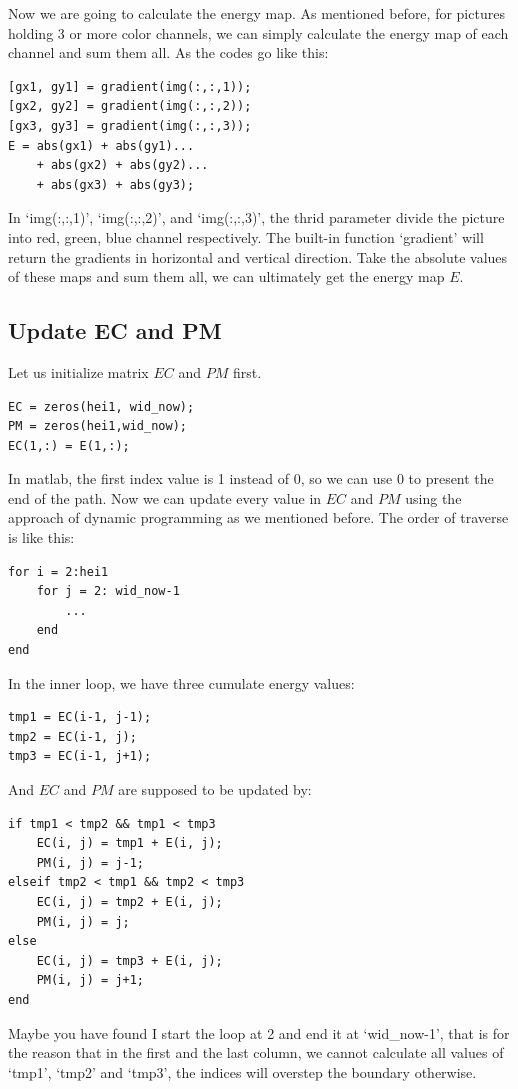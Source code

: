 \documentclass[final]{cvpr}
\begin{document}
Now we are going to calculate the energy map. As mentioned before, for pictures holding 3 or more color channels, we can simply calculate the energy map of each channel and sum them all. As the codes go like this:
\begin{lstlisting}
[gx1, gy1] = gradient(img(:,:,1));
[gx2, gy2] = gradient(img(:,:,2));
[gx3, gy3] = gradient(img(:,:,3));
E = abs(gx1) + abs(gy1)...
    + abs(gx2) + abs(gy2)...
    + abs(gx3) + abs(gy3);
\end{lstlisting}

In `img(:,:,1)', `img(:,:,2)', and `img(:,:,3)', the thrid parameter divide the picture into red, green, blue channel respectively. The built-in function `gradient' will return the gradients in horizontal and vertical direction. Take the absolute values of these maps and sum them all, we can ultimately get the energy map $E$.

\subsection{Update EC and PM}
Let us initialize matrix $EC$ and $PM$ first.
\begin{lstlisting}
EC = zeros(hei1, wid_now);
PM = zeros(hei1,wid_now);
EC(1,:) = E(1,:);
\end{lstlisting}

In matlab, the first index value is 1 instead of 0, so we can use 0 to present the end of the path.
Now we can update every value in $EC$ and $PM$ using the approach of dynamic programming as we mentioned before. The order of traverse is like this:
\begin{lstlisting}
for i = 2:hei1
    for j = 2: wid_now-1
        ...
    end
end
\end{lstlisting}

In the inner loop, we have three cumulate energy values:
\begin{lstlisting}
tmp1 = EC(i-1, j-1);
tmp2 = EC(i-1, j);
tmp3 = EC(i-1, j+1);
\end{lstlisting}

And $EC$ and $PM$ are supposed to be updated by:
\begin{lstlisting}
if tmp1 < tmp2 && tmp1 < tmp3
    EC(i, j) = tmp1 + E(i, j);
    PM(i, j) = j-1;
elseif tmp2 < tmp1 && tmp2 < tmp3
    EC(i, j) = tmp2 + E(i, j);
    PM(i, j) = j;
else
    EC(i, j) = tmp3 + E(i, j);
    PM(i, j) = j+1;
end
\end{lstlisting}

Maybe you have found I start the loop at 2 and end it at `wid\_now-1', that is for the reason that in the first and the last column, we cannot calculate all values of `tmp1', `tmp2' and `tmp3', the indices will overstep the boundary otherwise.
\end{document}
